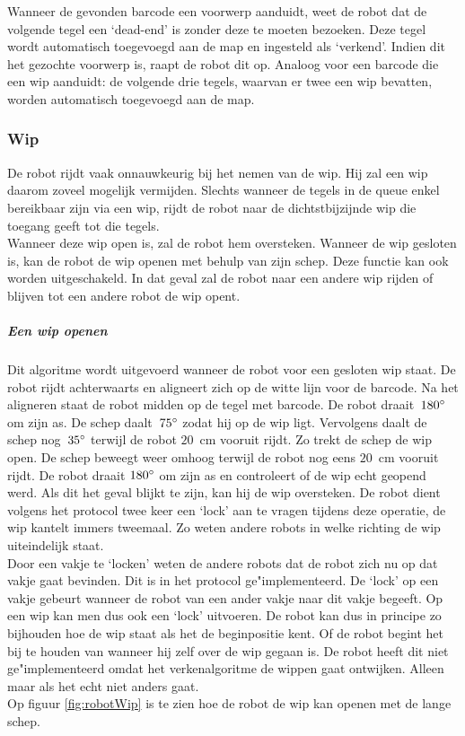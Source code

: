 \documentclass[eind]{penoverslag}
\begin{document}

Wanneer de gevonden barcode een voorwerp aanduidt, weet de robot dat de volgende tegel een `dead-end' is zonder deze te moeten bezoeken. Deze tegel wordt automatisch toegevoegd aan de map en ingesteld als `verkend'. Indien dit het gezochte voorwerp is, raapt de robot dit op.
Analoog voor een barcode die een wip aanduidt: de volgende drie tegels, waarvan er twee een wip bevatten, worden automatisch toegevoegd aan de map.


\subsubsection{Wip}
\label{sssec:AlgoWip}
De robot rijdt vaak onnauwkeurig bij het nemen van de wip. Hij zal een wip daarom zoveel mogelijk vermijden. Slechts wanneer de tegels in de queue enkel bereikbaar zijn via een wip, rijdt de robot naar de dichtstbijzijnde wip die toegang geeft tot die tegels.\\

Wanneer deze wip open is, zal de robot hem oversteken. Wanneer de wip gesloten is, kan de robot de wip openen met behulp van zijn schep. Deze functie kan ook worden uitgeschakeld. In dat geval zal de robot naar een andere wip rijden of blijven tot een andere robot de wip opent.

\subparagraph{Een wip openen} 
Dit algoritme wordt uitgevoerd wanneer de robot voor een gesloten wip staat. De robot rijdt achterwaarts en aligneert zich op de witte lijn voor de barcode. Na het aligneren staat de robot midden op de tegel met barcode. De robot draait~$180\degree$ om zijn as. De schep daalt~$75\degree$ zodat hij op de wip ligt. Vervolgens daalt de schep nog~$35\degree$ terwijl de robot $20$~cm vooruit rijdt. Zo trekt de schep de wip open. De schep beweegt weer omhoog terwijl de robot nog eens $20$~cm vooruit rijdt. De robot draait $180\degree$ om zijn as en controleert of de wip echt geopend werd. Als dit het geval blijkt te zijn, kan hij de wip oversteken. De robot dient volgens het protocol twee keer een `lock' aan te vragen tijdens deze operatie, de wip kantelt immers tweemaal. Zo weten andere robots in welke richting de wip uiteindelijk staat.\\
Door een vakje te `locken' weten de andere robots dat de robot zich nu op dat vakje gaat bevinden. Dit is in het protocol ge"implementeerd. De `lock' op een vakje gebeurt wanneer de robot van een ander vakje naar dit vakje begeeft. Op een wip kan men dus ook een `lock' uitvoeren. De robot kan dus in principe zo bijhouden hoe de wip staat als het de beginpositie kent. Of de robot begint het bij te houden van wanneer hij zelf over de wip gegaan is. De robot heeft dit niet ge"implementeerd omdat het verkenalgoritme de wippen gaat ontwijken. Alleen maar als het echt niet anders gaat. \\
Op figuur \ref{fig:robotWip} is te zien hoe de robot de wip kan openen met de lange schep.
\end{document}
